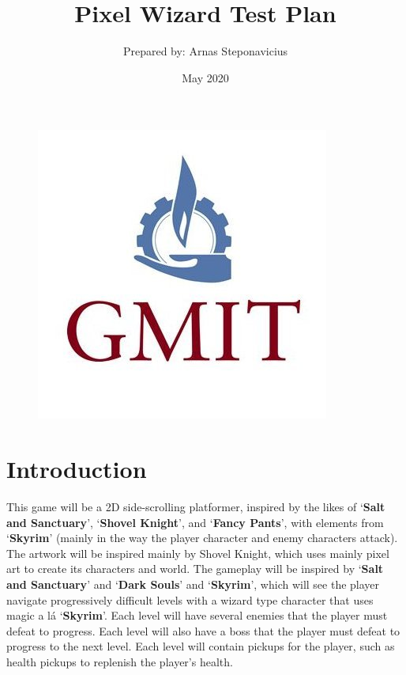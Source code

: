 \documentclass{article}
\begin{document}
\begin{figure}
    \centering
    \includegraphics[scale = 0.25]{images/gmit.jpg}
    \label{fig:gmit}
\end{figure}

\title{Pixel Wizard Test Plan}
\author{Prepared by: Arnas Steponavicius }
\date{May 2020}

\maketitle

\tableofcontents
\newpage

\section{Introduction}
    This game will be a 2D side-scrolling platformer, inspired by the likes of ‘\textbf{Salt and Sanctuary}’, ‘\textbf{Shovel  Knight}’, and ‘\textbf{Fancy  Pants}’, with elements from ‘\textbf{Skyrim}’ (mainly in the way the player character and enemy characters attack).
    The artwork will be inspired mainly by Shovel Knight, which uses mainly pixel art to create its characters and world. \newline
    The gameplay will be inspired by ‘\textbf{Salt and Sanctuary}’ and ‘\textbf{Dark Souls}’ and ‘\textbf{Skyrim}’, which will see the player navigate  progressively  difficult  levels  with  a  wizard type  character  that  uses magic a lá ‘\textbf{Skyrim}’.\newline
    Each level will have several enemies that the player must defeat to progress. Each level will also have a boss that the player must defeat to progress to the next level. Each level will contain pickups for the player, such as health pickups to replenish the player’s health.
    \newline
    \newline
\end{document}
